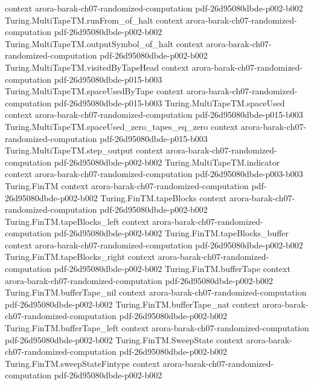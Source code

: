 \begin{theorem}
  {context}
  {arora-barak-ch07-randomized-computation}
  {pdf-26d95080dbde-p002-b002}
\proofstep
  {Turing.MultiTapeTM.runFrom_of_halt}
  {context}
  {arora-barak-ch07-randomized-computation}
  {pdf-26d95080dbde-p002-b002}
\proofstep
  {Turing.MultiTapeTM.outputSymbol_of_halt}
  {context}
  {arora-barak-ch07-randomized-computation}
  {pdf-26d95080dbde-p002-b002}
\proofstep
  {Turing.MultiTapeTM.visitedByTapeHead}
  {context}
  {arora-barak-ch07-randomized-computation}
  {pdf-26d95080dbde-p015-b003}
\proofstep
  {Turing.MultiTapeTM.spaceUsedByTape}
  {context}
  {arora-barak-ch07-randomized-computation}
  {pdf-26d95080dbde-p015-b003}
\proofstep
  {Turing.MultiTapeTM.spaceUsed}
  {context}
  {arora-barak-ch07-randomized-computation}
  {pdf-26d95080dbde-p015-b003}
\proofstep
  {Turing.MultiTapeTM.spaceUsed_zero_tapes_eq_zero}
  {context}
  {arora-barak-ch07-randomized-computation}
  {pdf-26d95080dbde-p015-b003}
\proofstep
  {Turing.MultiTapeTM.step_output}
  {context}
  {arora-barak-ch07-randomized-computation}
  {pdf-26d95080dbde-p002-b002}
\proofstep
  {Turing.MultiTapeTM.indicator}
  {context}
  {arora-barak-ch07-randomized-computation}
  {pdf-26d95080dbde-p003-b003}
\proofstep
  {Turing.FinTM}
  {context}
  {arora-barak-ch07-randomized-computation}
  {pdf-26d95080dbde-p002-b002}
\proofstep
  {Turing.FinTM.tapeBlocks}
  {context}
  {arora-barak-ch07-randomized-computation}
  {pdf-26d95080dbde-p002-b002}
\proofstep
  {Turing.FinTM.tapeBlocks_left}
  {context}
  {arora-barak-ch07-randomized-computation}
  {pdf-26d95080dbde-p002-b002}
\proofstep
  {Turing.FinTM.tapeBlocks_buffer}
  {context}
  {arora-barak-ch07-randomized-computation}
  {pdf-26d95080dbde-p002-b002}
\proofstep
  {Turing.FinTM.tapeBlocks_right}
  {context}
  {arora-barak-ch07-randomized-computation}
  {pdf-26d95080dbde-p002-b002}
\proofstep
  {Turing.FinTM.bufferTape}
  {context}
  {arora-barak-ch07-randomized-computation}
  {pdf-26d95080dbde-p002-b002}
\proofstep
  {Turing.FinTM.bufferTape_nil}
  {context}
  {arora-barak-ch07-randomized-computation}
  {pdf-26d95080dbde-p002-b002}
\proofstep
  {Turing.FinTM.bufferTape_nat}
  {context}
  {arora-barak-ch07-randomized-computation}
  {pdf-26d95080dbde-p002-b002}
\proofstep
  {Turing.FinTM.bufferTape_left}
  {context}
  {arora-barak-ch07-randomized-computation}
  {pdf-26d95080dbde-p002-b002}
\proofstep
  {Turing.FinTM.SweepState}
  {context}
  {arora-barak-ch07-randomized-computation}
  {pdf-26d95080dbde-p002-b002}
\proofstep
  {Turing.FinTM.sweepStateFintype}
  {context}
  {arora-barak-ch07-randomized-computation}
  {pdf-26d95080dbde-p002-b002}

\end{theorem}
